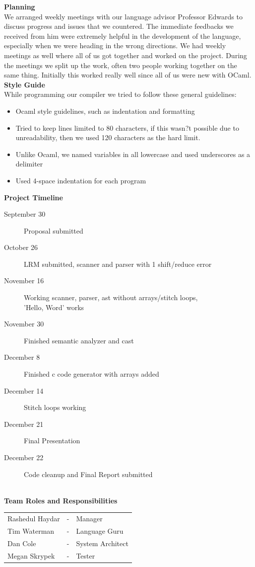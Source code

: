 \documentclass[11pt, oneside]{article}   	%
\newcommand{\tab} {\hspace*{2em}}
\begin{document}
\Large\textbf{Planning}\\[1em]
\normalsize
We arranged weekly meetings with our language advisor Professor Edwards to discuss progress and issues that we countered. The immediate feedbacks we received from him were extremely helpful in the development of the language, especially when we were heading in the wrong directions. We had weekly meetings as well where all of us got together and worked on the project. During the meetings we split up the work, often two people working together on the same thing. Initially this worked really well since all of us were new with OCaml. \\[3em]
\Large\textbf{Style Guide}\\[1em]
\normalsize
While programming our compiler we tried to follow these general guidelines:
\begin{itemize}
  \item Ocaml style guidelines, such as indentation and formatting
  \item Tried to keep lines limited to 80 characters, if this wasn?t possible due to unreadability, then we used 120 characters as the hard limit.
  \item Unlike Ocaml, we named variables in all lowercase and used underscores as a delimiter
  \item Used 4-space indentation for each program 
\end{itemize}
\newpage
\Large\textbf{Project Timeline}\\[0em]
\normalsize
\tab\begin{description}
  \item[September 30] Proposal submitted
  \item[October 26] LRM submitted, scanner and parser with 1 shift/reduce error
  \item[November 16] Working scanner, parser, ast without arrays/stitch loops, \\[.5em]'Hello, Word' works
  \item[November 30] Finished semantic analyzer and cast
  \item[December 8] Finished c code generator with arrays added
  \item[December 14] Stitch loops working 
  \item[December 21] Final Presentation
  \item[December 22] Code cleanup and Final Report submitted 
\end{description}
\tab\\[3em]
\Large\textbf{Team Roles and Responsibilities}\\[1em]
\normalsize
\tab\begin{tabular}{l c l}
Rashedul Haydar & - & Manager\\
Tim Waterman & - & Language Guru\\
Dan Cole & - & System Architect\\
Megan Skrypek & - & Tester\\
\end{tabular}\\
\end{document}
